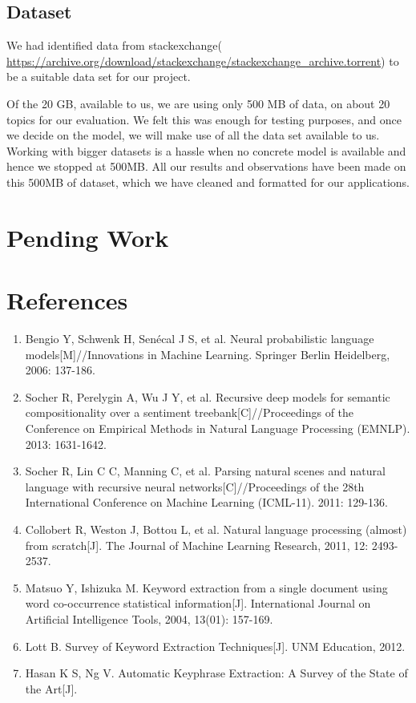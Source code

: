 \documentclass[dvips,12pt]{article}
\begin{document}
		\subsection{Dataset}
		
		We had identified data from stackexchange( \url{https://archive.org/download/stackexchange/stackexchange_archive.torrent}) to be a suitable data set for our project. 
		
		Of the 20 GB, available to us, we are using only 500 MB of data, on about 20 topics for our evaluation. We felt this was enough for testing purposes, and once we decide on the model, we will make use of all the data set available to us. Working with bigger datasets is a hassle when no concrete model is available and hence we stopped at 500MB.
		All our results and observations have been made on this 500MB of dataset, which we have cleaned and formatted for our applications. 
	
	\section{Pending Work}
	

	\section{References}
    \begin{enumerate}
        \item Bengio Y, Schwenk H, Senécal J S, et al. Neural probabilistic language models[M]//Innovations in Machine Learning. Springer Berlin Heidelberg, 2006: 137-186.
        \item Socher R, Perelygin A, Wu J Y, et al. Recursive deep models for semantic compositionality over a sentiment treebank[C]//Proceedings of the Conference on Empirical Methods in Natural Language Processing (EMNLP). 2013: 1631-1642.
        \item Socher R, Lin C C, Manning C, et al. Parsing natural scenes and natural language with recursive neural networks[C]//Proceedings of the 28th International Conference on Machine Learning (ICML-11). 2011: 129-136.
        \item Collobert R, Weston J, Bottou L, et al. Natural language processing (almost) from scratch[J]. The Journal of Machine Learning Research, 2011, 12: 2493-2537.
        \item Matsuo Y, Ishizuka M. Keyword extraction from a single document using word co-occurrence statistical information[J]. International Journal on Artificial Intelligence Tools, 2004, 13(01): 157-169.
        \item Lott B. Survey of Keyword Extraction Techniques[J]. UNM Education, 2012.
        \item Hasan K S, Ng V. Automatic Keyphrase Extraction: A Survey of the State of the Art[J].
    \end{enumerate}
\end{document}
